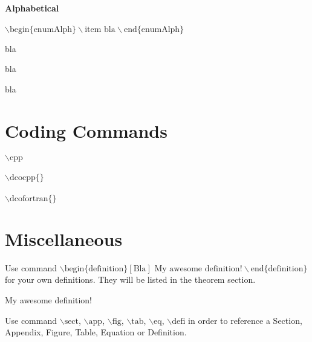 \documentclass[
  a4paper, 
  fontsize=12pt, 
  titlepage, 
  listof=totocnumbered, 
  index=totoc,        
  bibliography=totocnumbered, 
  numbers=noenddot
]{scrartcl}
\begin{document}
  \paragraph{Alphabetical} 
  $\backslash \text{begin}\lbrace\text{enumAlph}\rbrace \backslash \text{item bla}\backslash \text{end}\lbrace\text{enumAlph}\rbrace$
    \begin{enumAlph} 
      \item bla
      \item bla
      \item bla
    \end{enumAlph}
  
\section{Coding Commands}
  \paragraph{\cpp} $\backslash \text{cpp}$  
  \paragraph{\dcocpp{}} $\backslash \text{dcocpp}\lbrace\rbrace$  
  \paragraph{\dcofortran{}} $\backslash \text{dcofortran}\lbrace\rbrace$   

\section{Miscellaneous}
  Use command $\backslash \text{begin}\lbrace\text{definition}\rbrace\left[\text{Bla}\right] \text{ My awesome definition!} \backslash \text{end}\lbrace\text{definition}\rbrace$ for your own definitions. They will be listed in the theorem section.

  \begin{definition}[Bla]
    My awesome definition!
  \end{definition}

  \par Use command $\backslash \text{sect}$, $\backslash \text{app}$, $\backslash \text{fig}$, $\backslash \text{tab}$, $\backslash \text{eq}$, $\backslash \text{defi}$ in order to reference a Section, Appendix, Figure, Table, Equation or Definition.



  
\end{document}
